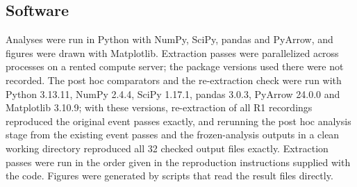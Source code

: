 \subsection{Software}

Analyses were run in Python with NumPy, SciPy, pandas and PyArrow, and figures were drawn with Matplotlib. Extraction passes were parallelized across processes on a rented compute server; the package versions used there were not recorded. The post hoc comparators and the re-extraction check were run with Python 3.13.11, NumPy 2.4.4, SciPy 1.17.1, pandas 3.0.3, PyArrow 24.0.0 and Matplotlib 3.10.9; with these versions, re-extraction of all R1 recordings reproduced the original event passes exactly, and rerunning the post hoc analysis stage from the existing event passes and the frozen-analysis outputs in a clean working directory reproduced all 32 checked output files exactly. Extraction passes were run in the order given in the reproduction instructions supplied with the code. Figures were generated by scripts that read the result files directly.
